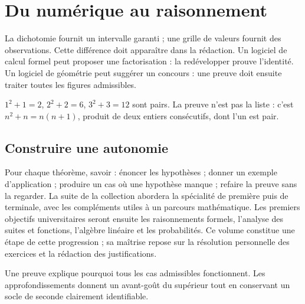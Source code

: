 \documentclass[../cours_2de.tex]{subfiles}
\begin{document}
\section{Du numérique au raisonnement}
La dichotomie fournit un intervalle garanti ; une grille de valeurs fournit des observations. Cette différence doit apparaître dans la rédaction.
Un logiciel de calcul formel peut proposer une factorisation : la redévelopper prouve l'identité.
Un logiciel de géométrie peut suggérer un concours : une preuve doit ensuite traiter toutes les figures admissibles.
\begin{exemple}
$1^2+1=2$, $2^2+2=6$, $3^2+3=12$ sont pairs. La preuve n'est pas la liste : c'est $n^2+n=n(n+1)$, produit de deux entiers consécutifs, dont l'un est pair.
\end{exemple}
\begin{finchapitre}
\section{Construire une autonomie}
Pour chaque théorème, savoir : énoncer les hypothèses ; donner un exemple d'application ; produire un cas où une hypothèse manque ; refaire la preuve sans la regarder.
La suite de la collection abordera la spécialité de première puis de terminale, avec les compléments utiles à un parcours mathématique. Les premiers objectifs universitaires seront ensuite les raisonnements formels, l'analyse des suites et fonctions, l'algèbre linéaire et les probabilités.
Ce volume constitue une étape de cette progression ; sa maîtrise repose sur la résolution personnelle des exercices et la rédaction des justifications.
\begin{retenir}
Une preuve explique pourquoi tous les cas admissibles fonctionnent. Les approfondissements donnent un avant-goût du supérieur tout en conservant un socle de seconde clairement identifiable.
\end{retenir}
\end{finchapitre}
\end{document}
